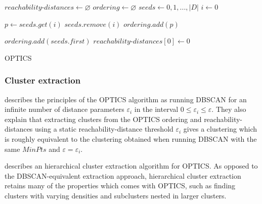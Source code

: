 \documentclass[a4paper]{report}
\begin{document}
{
    \fontsize{10}{12}
    \selectfont
    \begin{algorithm}[H]
        \DontPrintSemicolon
        \BlankLine
        \BlankLine

        $reachability$-$distances \gets \varnothing$\;
        $ordering \gets \varnothing$\;
        $seeds \gets 0,1,...,|D|$\;
        $i \gets 0$\;

         {
            $p \gets seeds.get(i)$\;
            $seeds.remove(i)$\;
            $ordering.add(p)$\;

        } 
        \;
        $ordering.add(seeds.first)$\;
        $reachability$-$distances[0] \gets 0$\;
        \BlankLine
        \caption{OPTICS}
        \label{alg:optics}
    \end{algorithm}
}

\subsubsection{Cluster extraction}

\citeauthor{ankerst99} describes the principles of the OPTICS algorithm as
running DBSCAN for an infinite number of distance parameters $\varepsilon_i$
in the interval $0 \le \varepsilon_i \le \varepsilon$. They also explain that
extracting clusters from the OPTICS ordering and reachability-distances using
a static reachability-distance threshold $\varepsilon_i$ gives a clustering
which is roughly equivalent to the clustering obtained when running DBSCAN
with the same $MinPts$ and $\varepsilon = \varepsilon_i$.

\citet{sander03} describes an hierarchical cluster extraction algorithm for
OPTICS. As opposed to the DBSCAN-equivalent extraction approach, hierarchical
cluster extraction retains many of the properties which comes with OPTICS,
such as finding clusters with varying densities and subclusters nested in larger
clusters.
\end{document}
